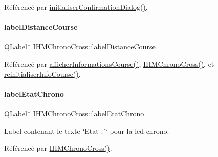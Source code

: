 Référencé par \hyperlink{class_i_h_m_chrono_cross_a866a247fad23eca2af31ed985afe7cd3}{initialiser\+Confirmation\+Dialog()}.

\mbox{\label{class_i_h_m_chrono_cross_a4748740a4973bf62c408be380ac0ae77}} 
\paragraph{\texorpdfstring{label\+Distance\+Course}{labelDistanceCourse}}
{\footnotesize\ttfamily Q\+Label$\ast$ I\+H\+M\+Chrono\+Cross\+::label\+Distance\+Course\hspace{0.3cm}{\ttfamily [private]}}



Référencé par \hyperlink{class_i_h_m_chrono_cross_afe18e84e4df15c15921f2bdcfc6f4396}{afficher\+Informations\+Course()}, \hyperlink{class_i_h_m_chrono_cross_a479fc90733fba3e65fb06aa4a3adc02e}{I\+H\+M\+Chrono\+Cross()}, et \hyperlink{class_i_h_m_chrono_cross_a1149f4f57c8cf34048f93fba6b4176b3}{reinitialiser\+Info\+Course()}.

\mbox{\label{class_i_h_m_chrono_cross_ad247dfd005cb835c90aca67b1384578b}} 
\paragraph{\texorpdfstring{label\+Etat\+Chrono}{labelEtatChrono}}
{\footnotesize\ttfamily Q\+Label$\ast$ I\+H\+M\+Chrono\+Cross\+::label\+Etat\+Chrono\hspace{0.3cm}{\ttfamily [private]}}



Label contenant le texte \char`\"{}\+Etat \+: \char`\"{} pour la led chrono. 



Référencé par \hyperlink{class_i_h_m_chrono_cross_a479fc90733fba3e65fb06aa4a3adc02e}{I\+H\+M\+Chrono\+Cross()}.

\mbox{\label{class_i_h_m_chrono_cross_a433796aedfcc26313f639bd5157b1135}} 
